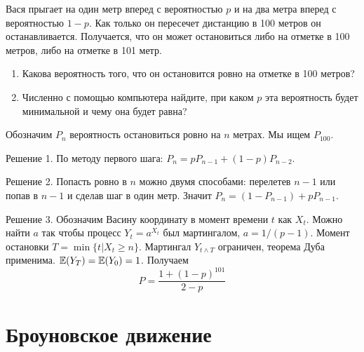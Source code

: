 \begin{problem}
Вася прыгает на один метр вперед с вероятностью $p$ и на два метра вперед с вероятностью $1-p$. Как только он пересечет дистанцию в 100 метров он останавливается. Получается, что он может остановиться либо на отметке в 100 метров, либо на отметке в 101 метр. 
\begin{enumerate}
\item Какова вероятность того, что он остановится ровно на отметке в 100 метров?
\item Численно с помощью компьютера найдите, при каком $p$ эта вероятность будет минимальной и чему она будет равна?
\end{enumerate}
\end{problem}
\begin{solution}  
Обозначим $P_n$ вероятность остановиться ровно на $n$ метрах. Мы ищем $P_{100}$. 

Решение 1. По методу первого шага:  $P_n=pP_{n-1}+(1-p)P_{n-2}$.

Решение 2. Попасть ровно в $n$ можно двумя способами: перелетев $n-1$ или попав в $n-1$ и сделав шаг в один метр. Значит $P_n=(1-P_{n-1})+pP_{n-1}$.

Решение 3. Обозначим Васину координату в момент времени $t$ как $X_t$. Можно найти $a$ так чтобы процесс $Y_t=a^{X_t}$ был мартингалом, $a=1/(p-1)$. Момент остановки $T=\min\{t|X_t\geq n\}$. Мартингал $Y_{t\wedge T}$ ограничен, теорема Дуба применима. $\mathbb{E}(Y_T)=\mathbb{E}(Y_0)=1$. Получаем 
\[
P=\frac{1+(1-p)^{101}}{2-p}
\]

\end{solution}

\section{Броуновское движение} 


